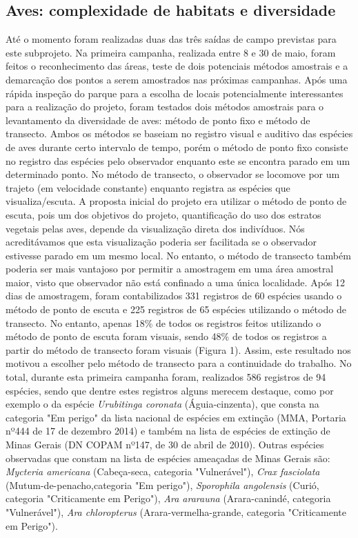 \subsection{Aves: complexidade de habitats e diversidade} %
\label{sec:compl-de-habit} 


Até o momento foram realizadas duas das três saídas de campo previstas para este subprojeto. Na primeira campanha, realizada entre 8 e 30 de maio, foram feitos o reconhecimento das áreas, teste de dois potenciais métodos amostrais e a demarcação dos pontos a serem amostrados nas próximas campanhas. Após uma rápida inspeção do parque para a escolha de locais potencialmente interessantes para a realização do projeto, foram testados dois métodos amostrais para o levantamento da diversidade de aves: método de ponto fixo e método de transecto. Ambos os métodos se baseiam no registro visual e auditivo das espécies de aves durante certo intervalo de tempo, porém o método de ponto fixo consiste no registro das espécies pelo observador enquanto este se encontra parado em um determinado ponto. No método de transecto, o observador se locomove por um trajeto (em velocidade constante) enquanto registra as espécies que visualiza/escuta.
A proposta inicial do projeto era utilizar o método de ponto de escuta, pois um dos objetivos do projeto, quantificação do uso dos estratos vegetais pelas aves, depende da visualização direta dos indivíduos. Nós acreditávamos que esta visualização poderia ser facilitada se o observador estivesse parado em um mesmo local. No entanto, o método de transecto também poderia ser mais vantajoso por permitir a amostragem em uma área amostral maior, visto que observador não está confinado a uma única localidade. Após 12 dias de amostragem, foram contabilizados 331 registros de 60 espécies usando o método de ponto de escuta e 225 registros de 65 espécies utilizando o método de transecto. No entanto, apenas 18\% de todos os registros feitos utilizando o método de ponto de escuta foram visuais, sendo 48\% de todos os registros a partir do método de transecto foram visuais (Figura 1). Assim, este resultado nos motivou a escolher pelo método de transecto para a continuidade do trabalho. 
No total, durante esta primeira campanha foram, realizados 586 registros de 94 espécies, sendo que dentre estes registros alguns merecem destaque, como por exemplo o da espécie \textit{Urubitinga coronata} (Águia-cinzenta), que consta na categoria "Em perigo" da lista nacional de espécies em extinção (MMA, Portaria nº444 de 17 de dezembro 2014) e também na lista de espécies de extinção de Minas Gerais (DN COPAM nº147, de 30 de abril de 2010). Outras espécies observadas que constam na lista de espécies ameaçadas de Minas Gerais são: \textit{Mycteria americana} (Cabeça-seca, categoria "Vulnerável"), \textit{Crax fasciolata} (Mutum-de-penacho,categoria "Em perigo"), \textit{Sporophila angolensis} (Curió, categoria "Criticamente em Perigo"), \textit{Ara ararauna}  (Arara-canindé, categoria "Vulnerável"), \textit{Ara chloropterus} (Arara-vermelha-grande, categoria "Criticamente em Perigo").

